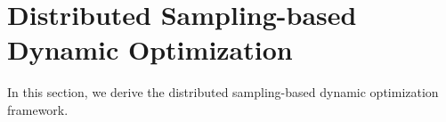 \documentclass[twoside,11pt]{article}
\begin{document}

\section{Distributed Sampling-based Dynamic Optimization}
\label{sec: distributed_opt}
In this section, we derive the distributed sampling-based dynamic optimization framework. 
\end{document}
